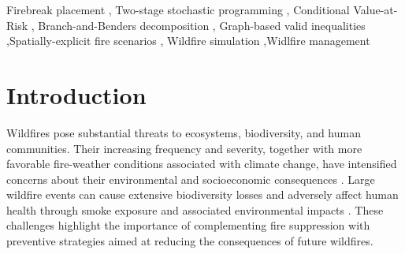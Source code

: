 \documentclass[a4paper,fleqn]{cas-sc}
\begin{document}
\begin{abstract}
    Wildfire prevention requires strategic firebreak placement decisions that account for uncertainty in fire ignition and propagation, as well as the potentially severe consequences of extreme events. We formulate the Firebreak Placement Problem as a risk-averse two-stage stochastic program that minimizes a weighted combination of expected wildfire loss and Conditional Value-at-Risk (CVaR). Wildfire scenarios generated using Cell2Fire are represented by directed propagation graphs, enabling the evaluation of firebreak placements under different propagation patterns. To solve the resulting stochastic optimization problem, we develop an exact Branch-and-Benders decomposition framework strengthened by two families of graph-based valid inequalities exploiting downstream coverage and directed propagation paths. We establish their validity for general directed graphs and show that the complete family of path-based inequalities characterizes the linear programming recourse function for fractional firebreak decisions. Computational experiments demonstrate that the path-strengthened algorithm achieves the highest overall optimality certification rate (84.9\%), compared with 77.3\% for a state-of-the-art combinatorial Branch-and-Benders approach and 63.6\% for the extensive mixed-integer formulation. 
\end{abstract}


\begin{keywords}
Firebreak placement \sep
Two-stage stochastic programming \sep
Conditional Value-at-Risk \sep
Branch-and-Benders decomposition \sep
Graph-based valid inequalities
\sep Spatially-explicit fire scenarios \sep 
 Wildfire simulation \sep Widlfire management
\end{keywords}


\maketitle


\section{Introduction}
\label{sec1}

Wildfires pose substantial threats to ecosystems, biodiversity,
and human communities. Their increasing frequency and severity,
together with more favorable fire-weather conditions associated
with climate change, have intensified concerns about their
environmental and socioeconomic consequences
\citep{jones2020climate,westerling2016increasing}.
Large wildfire events can cause extensive biodiversity losses
\citep{keeley2019fire,kelly2020fire,miranda2023widespread}
and adversely affect human health through smoke exposure
and associated environmental impacts
\citep{delfino2009relationship,dennekamp2011effects,
johnston2009bushfires,johnston2012estimated}.
These challenges highlight the importance of complementing
fire suppression with preventive strategies aimed at reducing
the consequences of future wildfires.
\end{document}
